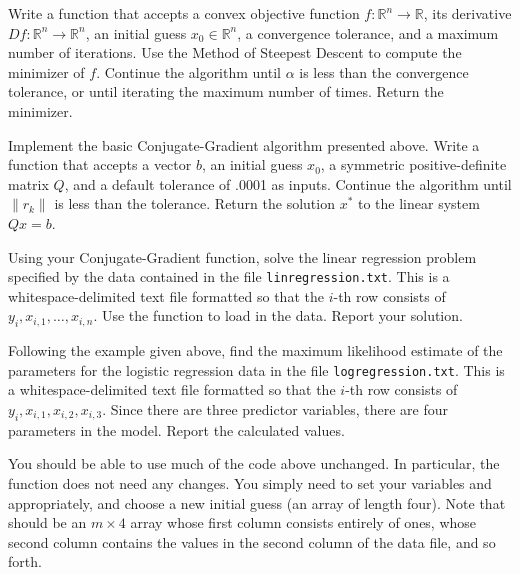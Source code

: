 
Write a function that accepts a convex objective function $f:\mathbb{R}^n\rightarrow\mathbb{R}$, its derivative $Df:\mathbb{R}^n\rightarrow\mathbb{R}^n$, an initial guess $x_0\in\mathbb{R}^n$, a convergence tolerance, and a maximum number of iterations.
Use the Method of Steepest Descent to compute the minimizer of $f$.
Continue the algorithm until $\alpha$ is less than the convergence tolerance, or until iterating the maximum number of times.
Return the minimizer.

Implement the basic Conjugate-Gradient algorithm presented above.
Write a function  that accepts a vector $b$, an initial
guess $x_0$, a symmetric positive-definite matrix $Q$, and a default tolerance of .0001 as inputs.
Continue the algorithm until $\|r_k\|$ is less than the tolerance.
Return the solution $x^*$ to the linear system $Qx = b$.

Using your Conjugate-Gradient function, solve the linear regression problem specified by the data contained in the file
\texttt{linregression.txt}. This is a whitespace-delimited text file formatted so that the $i$-th row consists of
$y_i, x_{i,1}, \ldots, x_{i,n}$. Use the function  to load in the data. Report your solution.

Following the example given above, find the maximum likelihood estimate of the parameters for the logistic regression data in the file \texttt{logregression.txt}.
This is a whitespace-delimited text file formatted so that the $i$-th row consists of $y_i, x_{i,1}, x_{i,2}, x_{i,3}.$
Since there are three predictor variables, there are four parameters in the model.
Report the calculated values.

You should be able to use much of the code above unchanged.
In particular, the function  does not need any changes.
You simply need to set your variables  and  appropriately, and choose a new initial guess (an array of length four).
Note that  should be an $m \times 4$ array whose first column consists entirely of ones, whose second column contains the values in the second column of the data file, and so forth.
